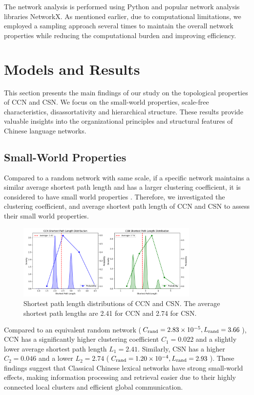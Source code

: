 \documentclass[11pt]{article}
\begin{document}
The network analysis is performed using Python and popular network analysis libraries NetworkX. As mentioned earlier, due to computational limitations, we employed a sampling approach several times to maintain the overall network properties while reducing the computational burden and improving efficiency.

\section{Models and Results}
This section presents the main findings of our study on the topological properties of CCN and CSN. We focus on the small-world properties, scale-free characteristics, disassortativity and hierarchical structure. These results provide valuable insights into the organizational principles and structural features of Chinese language networks.
\subsection{Small-World Properties}

Compared to a random network with same scale, if a specific network maintains a similar average shortest path length and has a larger clustering coefficient, it is considered to have small world properties \cite{watts1998collective}. Therefore, we investigated the clustering coefficient, and average shortest path length of CCN and CSN to assess their small world properties.
\begin{figure}[htbp]
    \centering
    \includegraphics[width=0.8\textwidth]{../analysis/shortest path/shortest path.png}
    \caption{Shortest path length distributions of CCN and CSN. The average shortest path lengths are 2.41 for CCN and 2.74 for CSN.}
    \label{fig:shortest_path}
    \end{figure}
    Compared to an equivalent random network ($C_{\rm rand}=2.83 \times 10^{-5}, L_{\rm rand}=3.66$), CCN has a significantly higher clustering coefficient $C_1=0.022$ and a slightly lower average shortest path length $L_1=2.41$. Similarly, CSN has a higher $C_2=0.046$ and a lower $L_2=2.74$ ($C_{\rm rand}=1.20 \times 10^{-4}, L_{\rm rand}=2.93$). These findings suggest that Classical Chinese lexical networks have strong small-world effects, making information processing and retrieval easier due to their highly connected local clusters and efficient global communication.
\end{document}
